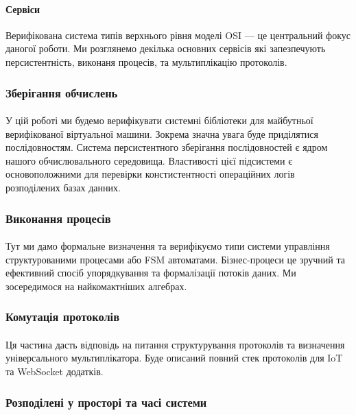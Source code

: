 \documentclass[11pt,oneside]{article}
\begin{document}
   \paragraph{\bf Сервіси}
   Верифікована система типів верхнього рівня моделі OSI --- це центральний фокус даногої роботи.
   Ми розглянемо декілька основних сервісів які запезпечують персистентність, виконаня процесів,
   та мультиплікацію протоколів.

   \newpage

\subsubsection{Зберігання обчислень}
   \paragraph{}
   У цій роботі ми будемо верифікувати системні бібліотеки для
   майбутньої верифікованої віртуальної машини. Зокрема значна увага буде приділятися
   послідовностям. Система персистентного зберігання послідовностей є ядром нашого
   обчислювального середовища. Властивості цієї підсистеми є основоположними
   для перевірки констистентності операційних логів розподілених базах данних.


\subsubsection{Виконання процесів}
   \paragraph{}
   Тут ми дамо формальне визначення та верифікуємо
   типи системи управління структурованими процесами або FSM автоматами.
   Бізнес-процеси це зручний та ефективний спосіб упорядкування та формалізації
   потоків даних. Ми зосередимося на найкомактніших алгебрах.

\subsubsection{Комутація протоколів}
   \paragraph{}
   Ця частина дасть відповідь на питання структурування
   протоколів та визначення універсального мультиплікатора. Буде описаний повний стек
   протоколів для IoT та WebSocket додатків.

\subsubsection{Розподілені у просторі та часі системи}
\end{document}
